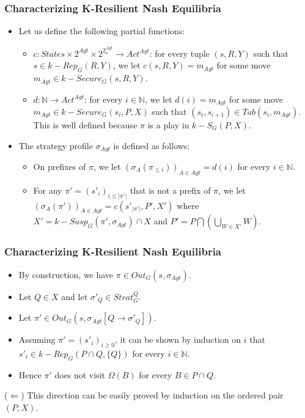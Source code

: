 \documentclass{beamer}
\begin{document}
\begin{frame}
\frametitle{Characterizing K-Resilient Nash Equilibria}
\begin{itemize}
\item Let us define the following partial functions:
\begin{itemize}
\item $c: States \times 2^{Agt} \times 2^{2^{Agt}_{k}} \rightarrow Act^{Agt}$: for every tuple $(s, R, Y)$ such that $s \in k-Rep_{G}(R, Y)$, we let $c(s, R, Y) = m_{Agt}$ for some move $m_{Agt} \in k-Secure_{G}(s, R, Y)$.
\item $d: \mathbb{N} \rightarrow Act^{Agt}$: for every $i \in \mathbb{N}$, we let $d(i) = m_{Agt}$ for some move $m_{Agt} \in k-Secure_{G}(s_{i}, P, X)$ such that $(s_{i}, s_{i+1}) \in Tab(s_{i}, m_{Agt})$. This is well defined because $\pi$ is a play in $k-S_{G}(P, X)$.
\end{itemize}
\item The strategy profile $\sigma_{Agt}$ is defined as follows:
\begin{itemize}
\item On prefixes of $\pi$, we let $(\sigma_{A}(\pi_{\leq i}))_{A\in Agt} = d(i)$ for every $i \in \mathbb{N}$.
\item For any $\pi' = (s'_{i})_{i\leq \vert \pi' \vert}$ that is not a prefix of $\pi$, we let $(\sigma_{A}(\pi'))_{A\in Agt} = c(s'_{\vert \pi' \vert}, P', X')$ where $X' = k-Susp_{G}(\pi', \sigma_{Agt}) \cap X$ and $P' = P \bigcap \left( \bigcup \limits_{W \in X'}W \right)$.
\end{itemize}
\end{itemize}
\end{frame}

\begin{frame}
\frametitle{Characterizing K-Resilient Nash Equilibria}
\begin{itemize}
\item By construction, we have $\pi \in Out_{G}(s, \sigma_{Agt})$.
\item Let $Q \in X$ and let $\sigma'_{Q} \in Strat^{Q}_{G}$.
\item Let $\pi' \in Out_{G}(s, \sigma_{Agt}[Q \rightarrow \sigma'_{Q}])$.
\item Assuming $\pi' = (s'_{i})_{i\geq 0}$, it can be shown by induction on $i$ that $s'_{i} \in k-Rep_{G}(P \cap Q, \lbrace Q \rbrace)$ for every $i \in \mathbb{N}$.
\item Hence $\pi'$ does not visit $\Omega(B)$ for every $B \in P \cap Q$.
\end{itemize}
($\Leftarrow$) This direction can be easily proved by induction on the ordered pair $(P, X)$.
\end{frame}
\end{document}
